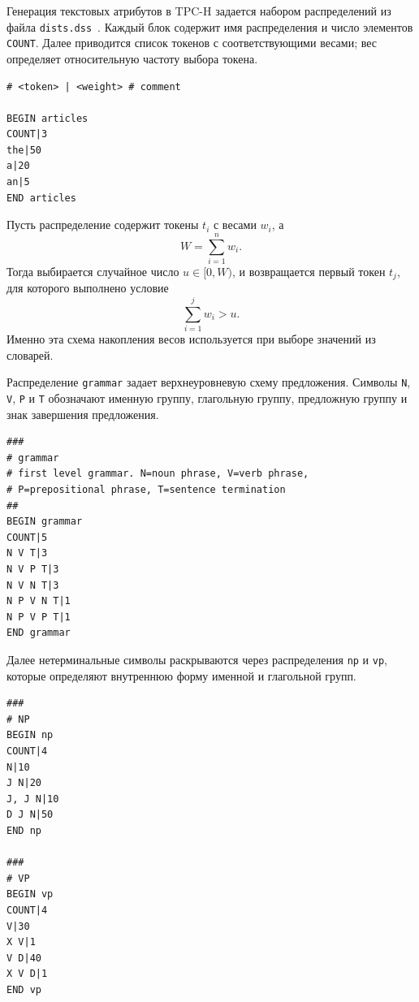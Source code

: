 Генерация текстовых атрибутов в TPC-H задается набором распределений
из файла \texttt{dists.dss}~\cite{tpch-spec,dbgen-mirror}. Каждый блок содержит
имя распределения и число элементов \texttt{COUNT}. Далее приводится список
токенов с соответствующими весами; вес определяет относительную частоту выбора
токена.

\begin{lstlisting}[style=reportdss,caption={Общий вид распределения},label={lst:chapter3-dss-format}]
# <token> | <weight> # comment

BEGIN articles
COUNT|3
the|50
a|20
an|5
END articles
\end{lstlisting}

Пусть распределение содержит токены $t_i$ с весами $w_i$, а
\begin{equation}
    W = \sum_{i=1}^{n} w_i.
\end{equation}
Тогда выбирается случайное число $u \in [0, W)$, и возвращается первый токен
$t_j$, для которого выполнено условие
\begin{equation}
    \sum_{i=1}^{j} w_i > u.
\end{equation}
Именно эта схема накопления весов используется при выборе значений из словарей.

Распределение \texttt{grammar} задает верхнеуровневую схему предложения.
Символы \texttt{N}, \texttt{V}, \texttt{P} и \texttt{T} обозначают именную
группу, глагольную группу, предложную группу и знак завершения предложения.

\begin{lstlisting}[style=reportdss,caption={Верхнеуровневая грамматика предложения},label={lst:chapter3-dss-grammar}]
###
# grammar
# first level grammar. N=noun phrase, V=verb phrase,
# P=prepositional phrase, T=sentence termination
##
BEGIN grammar
COUNT|5
N V T|3
N V P T|3
N V N T|3
N P V N T|1
N P V P T|1
END grammar
\end{lstlisting}

Далее нетерминальные символы раскрываются через распределения \texttt{np} и
\texttt{vp}, которые определяют внутреннюю форму именной и глагольной групп.

\begin{lstlisting}[style=reportdss,caption={Раскрытие именной и глагольной групп},label={lst:chapter3-dss-np-vp}]
###
# NP
BEGIN np
COUNT|4
N|10
J N|20
J, J N|10
D J N|50
END np

###
# VP
BEGIN vp
COUNT|4
V|30
X V|1
V D|40
X V D|1
END vp
\end{lstlisting}

